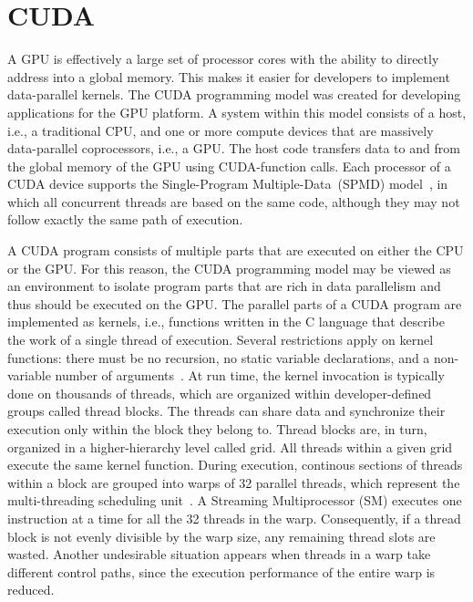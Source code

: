 \section{CUDA \label{sec:02-CUDA}}

A GPU is effectively a large set of processor cores with the ability
to directly address into a global memory. This makes it easier for
developers to implement data-parallel kernels. The CUDA programming
model \cite{CUDA} was created for developing applications for the
GPU platform. A system within this model consists of a host, i.e.,
a traditional CPU, and one or more compute devices that are massively
data-parallel coprocessors, i.e., a GPU. The host code transfers data
to and from the global memory of the GPU using CUDA-function calls.
Each processor of a CUDA device supports the Single-Program Multiple-Data~(SPMD)
model~\cite{Atallah-Algorithms_and_theory_of_computation:2002},
in which all concurrent threads are based on the same code, although
they may not follow exactly the same path of execution.

A CUDA program consists of multiple parts that are executed on either
the CPU or the GPU. For this reason, the CUDA programming model may
be viewed as an environment to isolate program parts that are rich
in data parallelism and thus should be executed on the GPU. The parallel
parts of a CUDA program are implemented as kernels, i.e., functions
written in the C language that describe the work of a single thread
of execution. Several restrictions apply on kernel functions: there
must be no recursion, no static variable declarations, and a non-variable
number of arguments~\cite{Ryoo-Optimization_principles_of_a_GPU_using_CUDA:2008}.
At run time, the kernel invocation is typically done on thousands
of threads, which are organized within developer-defined groups called
thread blocks. The threads can share data and synchronize their execution
only within the block they belong to. Thread blocks are, in turn,
organized in a higher-hierarchy level called grid. All threads within
a given grid execute the same kernel function. During execution, continous
sections of threads within a block are grouped into warps of 32 parallel
threads, which represent the multi-threading scheduling unit~\cite{Ryoo-Optimization_principles_of_a_GPU_using_CUDA:2008}.
A Streaming Multiprocessor (SM)
executes one instruction at a time for all the 32 threads in the warp.
Consequently, if a thread block is not evenly divisible by the warp
size, any remaining thread slots are wasted. Another undesirable situation
appears when threads in a warp take different control paths, since
the execution performance of the entire warp is reduced.

